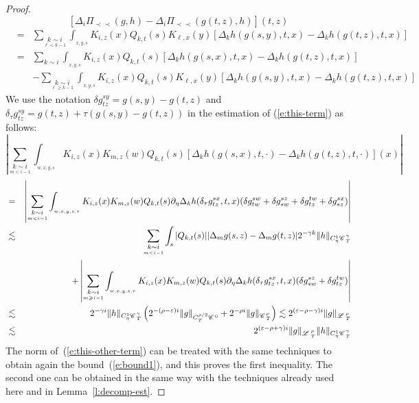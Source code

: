 \documentclass[11pt,reqno]{amsart}
\newcommand{\cdummy}{\cdot}
\newcommand{\precprec}{\prec\!\!\!\prec}
\newcommand{\CC}{\mathscr{C} \hspace{.1em}}
\newcommand{\LL}{\mathscr{L} \hspace{.2em}}
\begin{document}
\begin{proof}
  
  \[ [\Delta_i \Pi_{\precprec} (g, h) - \Delta_i \Pi_{\precprec} (g (t, z),
     h)] (t, z) \]
  \begin{eqnarray}
    & = & \sum_{\underset{\ell < k - 1}{k \sim i}} \int_{_{x, y, s}} K_{i, z}
    (x) Q_{k, t} (s) K_{\ell, x} (y) [\Delta_k h (g (s, y), t, x) - \Delta_k h
    (g (t, z), t, x)] \nonumber\\
    & = & \sum_{k \sim i} \int_{_{x, y, s}} K_{i, z} (x) Q_{k, t} (s)
    [\Delta_k h (g (s, x), t, x) - \Delta_k h (g (t, z), t, x)] 
    \label{e:this-term}\\
    &  & - \sum_{\underset{\ell \geqslant k - 1}{k \sim i}} \int_{_{x, y, s}}
    K_{i, z} (x) Q_{k, t} (s) K_{\ell, x} (y) [\Delta_k h (g (s, y), t, x) -
    \Delta_k h (g (t, z), t, x)]   \label{e:this-other-term}
  \end{eqnarray}
  We use the notation $\delta g^{s y}_{t z} = g (s, y) - g (t, z)$ and
  $\delta_{\tau} g^{s y}_{t z} = g (t, z) + \tau (g (s, y) - g (t, z))$ in the
  estimation of (\ref{e:this-term}) as follows:
  \[ \left| \sum_{\underset{m < i - 1}{k \sim i} \overset{}{}} \int_{_{w, x,
     y, s}} K_{i, z} (x) K_{m, z} (w) Q_{k, t} (s) [\Delta_k h (g (s, x), t,
     \cdummy) - \Delta_k h (g (t, z), t, \cdummy)] (x) \right| \]
  \begin{eqnarray}
    & = & \left| \sum_{\underset{m < i - 1}{k \sim i} \overset{}{}}
    \int_{_{w, x, y, s, \tau}} K_{i, z} (x) K_{m, z} (w) Q_{k, t} (s)
    \partial_{\eta} \Delta_k h (\delta_{\tau} g^{s x}_{t z}, t, x) (\delta
    g^{s w}_{t w} + \delta g^{s z}_{s w} + \delta g^{t w}_{t z} + \delta g^{s
    x}_{s z}) \right| \nonumber\\
    & \lesssim & \sum_{\underset{m < i - 1}{k \sim i} \overset{}{}} \int_s |
    Q_{k, t} (s) | | \Delta_m g (s, z) - \Delta_m g (t, z) | 2^{- \gamma k} \|
    h \|_{C_{\eta}^1 \CC_T^{\gamma}} \nonumber\\
    &  & + \left| \sum_{\underset{m \geqslant i - 1}{k \sim i} \overset{}{}}
    \int_{_{w, x, y, s, \tau}} K_{i, z} (x) K_{m, z} (w) Q_{k, t} (s)
    \partial_{\eta} \Delta_k h (\delta_{\tau} g^{s x}_{t z}, t, x) (\delta
    g^{s z}_{s w} + \delta g^{t w}_{t z}) \right| \nonumber\\
    & \lesssim & 2^{- \gamma i}  \| h \|_{C_{\eta}^1 \CC_T^{\gamma}} \left(
    2^{- (\rho - \varepsilon) i} \| g \|_{C_T^{\rho / 2} \CC^0} + 2^{- \rho i}
    \| g \|_{\CC^{\rho}_T} \right) \lesssim 2^{(\varepsilon - \rho - \gamma)
    i} \| g \|_{\LL^{\rho}_T} \nonumber\\
    & \lesssim & 2^{(\varepsilon - \rho + \gamma) i} \| g \|_{\LL^{\rho}_T}
    \| h \|_{C_{\eta}^1 \CC_T^{\gamma}}  \label{e:bound1}
  \end{eqnarray}
  The norm of~(\ref{e:this-other-term}) can be treated with the same
  techniques to obtain again the bound~(\ref{e:bound1}), and this proves the
  first inequality. The second one can be obtained in the same way with the
  techniques already used here and in Lemma~\ref{l:decomp-est}.
\end{proof}
\end{document}
